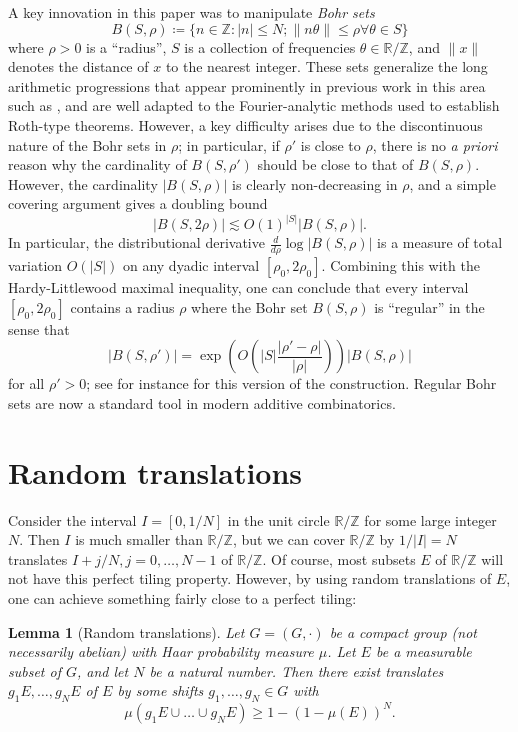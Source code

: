 \documentclass[12pt,a4paper,reqno]{amsart}
\numberwithin{equation}{section}
\theoremstyle{plain}
\newtheorem{lemma}[theorem]{Lemma}
\theoremstyle{definition}
\newcommand\R{\mathbb{R}}
\newcommand\Z{\mathbb{Z}}
\begin{document}
A key innovation in this paper was to manipulate \emph{Bohr sets}
$$ B(S,\rho) \coloneqq \{ n \in \Z: |n| \leq N; \| n \theta \| \leq \rho \forall \theta \in S \}$$
where $\rho>0$ is a ``radius'', $S$ is a collection of frequencies $\theta \in \R/\Z$, and $\|x\|$ denotes the distance of $x$ to the nearest integer.  These sets generalize the long arithmetic progressions that appear prominently in previous work in this area such as \cite{roth-thm}, and are well adapted to the Fourier-analytic methods used to establish Roth-type theorems.  However, a key difficulty arises due to the discontinuous nature of the Bohr sets in $\rho$; in particular, if $\rho'$ is close to $\rho$, there is no \emph{a priori} reason why the cardinality of $B(S,\rho')$ should be close to that of $B(S,\rho)$.  However, the cardinality $|B(S,\rho)|$ is clearly non-decreasing in $\rho$, and a simple covering argument gives a doubling bound
$$ |B(S,2\rho)| \lesssim O(1)^{|S|} |B(S,\rho)|.$$
In particular, the distributional derivative $\frac{d}{d\rho} \log |B(S,\rho)|$ is a measure of total variation $O( |S| )$ on any dyadic interval $[\rho_0, 2\rho_0]$.  Combining this with the Hardy-Littlewood maximal inequality, one can conclude that every interval $[\rho_0,2\rho_0]$ contains a radius $\rho$ where the Bohr set $B(S,\rho)$ is ``regular'' in the sense that
$$ |B(S,\rho')| = \exp\left( O\left( |S| \frac{|\rho'-\rho|}{|\rho|} \right)\right) |B(S,\rho)|$$
for all $\rho' > 0$; see for instance \cite[Lemma 4.25]{tao-vu} for this version of the construction.  Regular Bohr sets are now a standard tool in modern additive combinatorics.

\section{Random translations}\label{random-sec}

Consider the interval $I = [0,1/N]$ in the unit circle $\R/\Z$ for some large integer $N$.  Then $I$ is much smaller than $\R/\Z$, but we can cover $\R/\Z$ by $1/|I|=N$ translates $I+j/N, j=0,\dots,N-1$ of $\R/\Z$.  Of course, most subsets $E$ of $\R/\Z$ will not have this perfect tiling property.  However, by using random translations of $E$, one can achieve something fairly close to a perfect tiling:

\begin{lemma}[Random translations]\label{translate}  Let $G = (G,\cdot)$ be a compact group (not necessarily abelian) with Haar probability measure $\mu$.  Let $E$ be a measurable subset of $G$, and let $N$ be a natural number.  Then there exist translates $g_1 E, \dots, g_N E$ of $E$ by some shifts $g_1,\dots,g_N \in G$ with
$$ \mu( g_1 E \cup \dots \cup g_N E ) \geq 1 - (1-\mu(E))^N.$$
\end{lemma}
\end{document}
